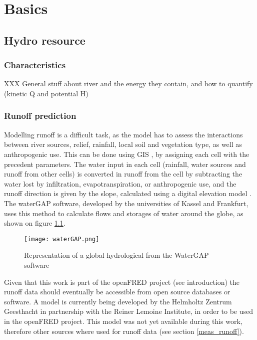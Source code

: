 \chapter{Basics}
\label{chap:basics}

\section{Hydro resource}
 \subsection{Characteristics}
 XXX General stuff about river and the energy they contain, and how to quantify (kinetic Q and potential H)
 
 \subsection{Runoff prediction}
 
Modelling runoff is a difficult task, as the model has to assess the interactions between river sources, relief, rainfall, local soil and vegetation type, as well as anthropogenic use. This can be done using GIS \cite{bayazit}, by assigning each cell with the precedent parameters. The water input in each cell (rainfall, water sources and runoff from other cells) is converted in runoff from the cell by subtracting the water lost by infiltration, evapotranspiration, or anthropogenic use, and the runoff direction is given by the slope, calculated using a digital elevation model \cite{heywood}. \newline
The waterGAP software, developed by the universities of Kassel and Frankfurt, uses this method to calculate flows and storages of water around the globe, as shown on figure \ref{waterGAP}.

\begin{figure}[H]
\texttt{[image: waterGAP.png]}
\caption[Representation of a global hydrological from the WaterGAP software]{Representation of a global hydrological from the WaterGAP software \cite{doll}}
\centering
\label{waterGAP}
\end{figure}

Given that this work is part of the openFRED project (see introduction) the runoff data should eventually be accessible from open source databases or software. A model is currently being developed by the Helmholtz Zentrum Geesthacht in partnership with the Reiner Lemoine Institute, in order to be used in the openFRED project. This model was not yet available during this work, therefore other sources where used for runoff data (see section \ref{meas_runoff}).
 
